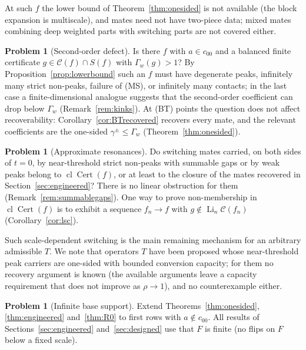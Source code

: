 \documentclass[10pt]{amsart}
\theoremstyle{definition}
\newtheorem{problem}[theorem]{Problem}
\theoremstyle{remark}
\newcommand{\Cset}{\mathcal C}
\newcommand{\Cert}{\operatorname{Cert}}
\newcommand{\Li}{\operatorname*{Li}}
\newcommand{\cl}{\operatorname{cl}}
\begin{document}
At such $f$ the lower bound of Theorem~\ref{thm:onesided} is not available
(the block expansion is multiscale), and mates need not have two-piece data;
mixed mates combining deep weighted parts with switching parts are not
covered either.

\begin{problem}[Second-order defect]\label{prob:secondorder}
Is there $f$ with $a\in c_{00}$ and a balanced finite certificate
$g\in\Cset(f)\cap S(f)$ with $\Gamma_w(g)>1$?  By
Proposition~\ref{prop:lowerbound} such an $f$ must have degenerate peaks,
infinitely many strict non-peaks, failure of (MS), or infinitely many
contacts; in the last case a finite-dimensional analogue suggests that the
second-order coefficient can drop below $\Gamma_w$ (Remark~\ref{rem:kinks}).
At \textup{(BT)} points the question does not affect recoverability:
Corollary~\ref{cor:BTrecovered} recovers every mate, and the relevant
coefficients are the one-sided $\gamma^\pm\le\Gamma_w$
(Theorem~\ref{thm:onesided}).
\end{problem}

\begin{problem}[Approximate resonances]\label{prob:approx}
Do switching mates carried, on both sides of $t=0$, by near-threshold
strict non-peaks with summable gaps or by weak peaks belong to
$\cl\Cert(f)$, or at least to the closure of the mates recovered in
Section~\ref{sec:engineered}?  There is no linear obstruction for them
(Remark~\ref{rem:summablegaps}).  One way to prove non-membership in
$\cl\Cert(f)$ is to exhibit a sequence $f_n\to f$ with
$g\notin\Li_n\Cset(f_n)$ (Corollary~\ref{cor:lsc}).
\end{problem}

Such scale-dependent switching is the main remaining mechanism for an
arbitrary admissible $T$.  We note that operators $T$ have been proposed whose
near-threshold peak carriers are one-sided with bounded conversion capacity;
for them no recovery argument is known (the available arguments leave a
capacity requirement that does not improve as $\rho\to1$), and no
counterexample either.

\begin{problem}[Infinite base support]\label{prob:infiniteF}
Extend Theorems~\ref{thm:onesided}, \ref{thm:engineered} and~\ref{thm:R0}
to first rows with $a\notin c_{00}$.  All results of
Sections~\ref{sec:engineered} and~\ref{sec:designed} use that $F$ is finite
(no flips on $F$ below a fixed scale).
\end{problem}
\end{document}
